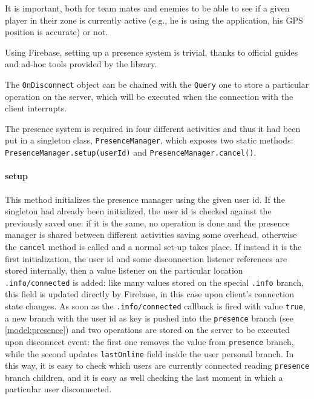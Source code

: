 			It is important, both for team mates and enemies to be able to see if a given player in their zone is currently active (e.g., he is using the application, his GPS position is accurate) or not.
			
			Using Firebase, setting up a presence system is trivial, thanks to official guides\cite{firebase:presence} and ad-hoc tools provided by the library.
			
			The \lstinline|OnDisconnect| object can be chained with the \lstinline|Query| one to store a particular operation on the server, which will be executed when the connection with the client interrupts.
			
			The presence system is required in four different activities and thus it had been put in a singleton class, \lstinline|PresenceManager|, which exposes two static methods: \lstinline|PresenceManager.setup(userId)| and \lstinline|PresenceManager.cancel()|.
		 
			\paragraph{setup}
			This method initializes the presence manager using the given user id.
			If the singleton had already been initialized, the user id is checked against the previously saved one: if it is the same, no operation is done and the presence manager is shared between different activities saving some overhead, otherwise the \lstinline|cancel| method is called and a normal set-up takes place.
			If instead it is the first initialization, the user id and some disconnection listener references are stored internally, then a value listener on the particular location \lstinline|.info/connected| is added: like many values stored on the special \lstinline|.info| branch, this field is updated directly by Firebase, in this case upon client's connection state changes.
			As soon as the \lstinline|.info/connected| callback is fired with value \lstinline|true|, a new branch with the user id as key is pushed into the \lstinline|presence| branch (see \autoref{model:presence}) and two operations are stored on the server to be executed upon disconnect event: the first one removes the value from \lstinline|presence| branch, while the second updates \lstinline|lastOnline| field inside the user personal branch.
			In this way, it is easy to check which users are currently connected reading \lstinline|presence| branch children, and it is easy as well checking the last moment in which a particular user disconnected.
			
